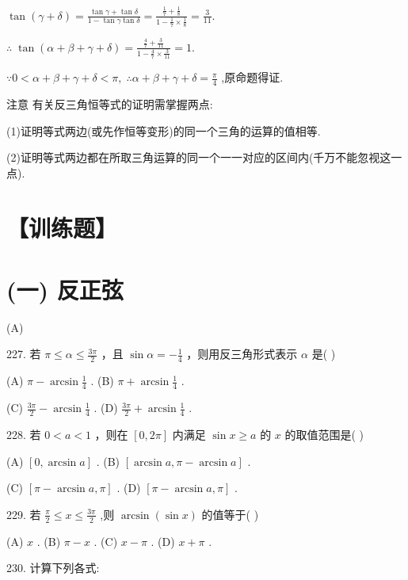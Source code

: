 \documentclass[10pt]{article}
\begin{document}
\(\tan \left( {\gamma  + \delta }\right)  = \frac{\tan \gamma  + \tan \delta }{1 - \tan \gamma \tan \delta } = \frac{\frac{1}{7} + \frac{1}{8}}{1 - \frac{1}{7} \times  \frac{1}{8}} = \frac{3}{11}.\)

\(\therefore \;\tan \left( {\alpha  + \beta  + \gamma  + \delta }\right)  = \frac{\frac{4}{7} + \frac{3}{11}}{1 - \frac{4}{7} \times  \frac{3}{11}} = 1.\)

\(\because 0 < \alpha  + \beta  + \gamma  + \delta  < \pi ,\;\therefore \alpha  + \beta  + \gamma  + \delta  = \frac{\pi }{4}\) ,原命题得证.

注意 有关反三角恒等式的证明需掌握两点:

(1)证明等式两边(或先作恒等变形)的同一个三角的运算的值相等.

(2)证明等式两边都在所取三角运算的同一个一一对应的区间内(千万不能忽视这一点).

\section*{【训练题】}

\section*{(一) 反正弦}

(A)

227. 若 \(\pi  \leq  \alpha  \leq  \frac{3\pi }{2}\) ，且 \(\sin \alpha  =  - \frac{1}{4}\) ，则用反三角形式表示 \(\alpha\) 是( )

(A) \(\pi  - \arcsin \frac{1}{4}\) . (B) \(\pi  + \arcsin \frac{1}{4}\) .

(C) \(\frac{3\pi }{2} - \arcsin \frac{1}{4}\) . (D) \(\frac{3\pi }{2} + \arcsin \frac{1}{4}\) .

228. 若 \(0 < a < 1\) ，则在 \(\left\lbrack  {0,{2\pi }}\right\rbrack\) 内满足 \(\sin x \geq  a\) 的 \(x\) 的取值范围是( )

(A) \(\left\lbrack  {0,\arcsin a}\right\rbrack\) . (B) \(\left\lbrack  {\arcsin a,\pi  - \arcsin a}\right\rbrack\) .

(C) \(\left\lbrack  {\pi  - \arcsin a,\pi }\right\rbrack\) . (D) \(\left\lbrack  {\pi  - \arcsin a,\pi }\right\rbrack\) .

229. 若 \(\frac{\pi }{2} \leq  x \leq  \frac{3\pi }{2}\) ,则 \(\arcsin \left( {\sin x}\right)\) 的值等于( )

(A) \(x\) . (B) \(\pi  - x\) . (C) \(x - \pi\) . (D) \(x + \pi\) .

230. 计算下列各式:
\end{document}
